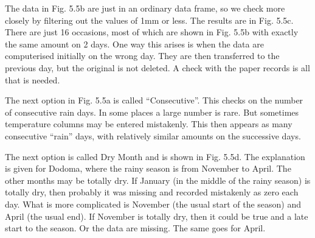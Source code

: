 \documentclass[
  letterpaper,
  DIV=11,
  numbers=noendperiod]{scrreprt}
\begin{document}
The data in Fig. 5.5b are just in an ordinary data frame, so we check
more closely by filtering out the values of 1mm or less. The results are
in Fig. 5.5c. There are just 16 occasions, most of which are shown in
Fig. 5.5b with exactly the same amount on 2 days. One way this arises is
when the data are computerised initially on the wrong day. They are then
transferred to the previous day, but the original is not deleted. A
check with the paper records is all that is needed.

The next option in Fig. 5.5a is called ``Consecutive''. This checks on
the number of consecutive rain days. In some places a large number is
rare. But sometimes temperature columns may be entered mistakenly. This
then appears as many consecutive ``rain'' days, with relatively similar
amounts on the successive days.

The next option is called Dry Month and is shown in Fig. 5.5d. The
explanation is given for Dodoma, where the rainy season is from November
to April. The other months may be totally dry. If January (in the middle
of the rainy season) is totally dry, then probably it was missing and
recorded mistakenly as zero each day. What is more complicated is
November (the usual start of the season) and April (the usual end). If
November is totally dry, then it could be true and a late start to the
season. Or the data are missing. The same goes for April.
\end{document}
